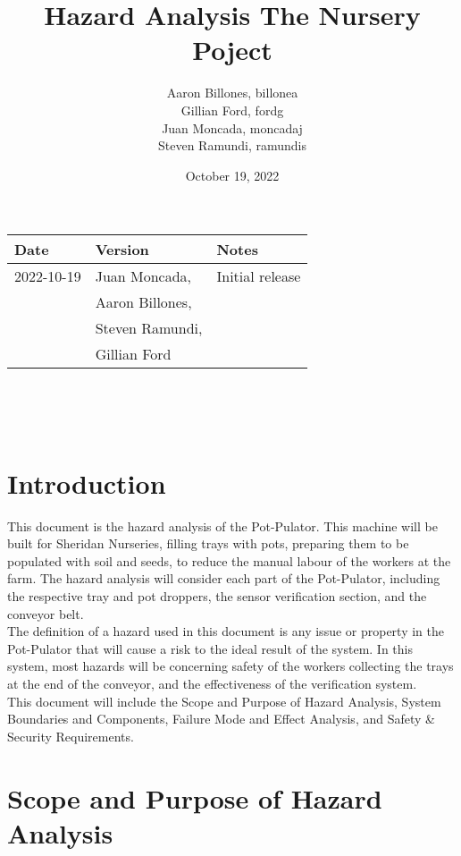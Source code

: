 \documentclass{article}
\title{Hazard Analysis The Nursery Poject}
\author{Aaron Billones, billonea\\Gillian Ford, fordg\\Juan Moncada, moncadaj\\Steven Ramundi, ramundis}
\date{October 19, 2022}
\begin{document}
\maketitle
\thispagestyle{empty}




\begin{tabularx}{\textwidth}{p{3cm}p{4cm}X}
    \toprule {\bf Date} & {\bf Version} & {\bf Notes}\\
    \midrule
    2022-10-19 & Juan Moncada,& Initial release\\&Aaron Billones,\\&Steven Ramundi,\\&Gillian Ford \\
    
    \bottomrule
\end{tabularx}

~\newpage

\tableofcontents

~\newpage


\section{Introduction}

\noindent This document is the hazard analysis of the Pot-Pulator. This machine will be built for Sheridan Nurseries, filling trays with pots, preparing them to be populated with soil and seeds, to reduce the manual labour of the workers at the farm. The hazard analysis will consider each part of the Pot-Pulator, including the respective tray and pot droppers, the sensor verification section, and the conveyor belt. 
\\

\noindent The definition of a hazard used in this document is any issue or property in the Pot-Pulator that will cause a risk to the ideal result of the system. In this system, most hazards will be concerning safety of the workers collecting the trays at the end of the conveyor, and the effectiveness of the verification system. 
\\

\noindent This document will include the Scope and Purpose of Hazard Analysis, System Boundaries and Components, Failure Mode and Effect Analysis, and Safety \& Security Requirements.  

\section{Scope and Purpose of Hazard Analysis}
\end{document}
